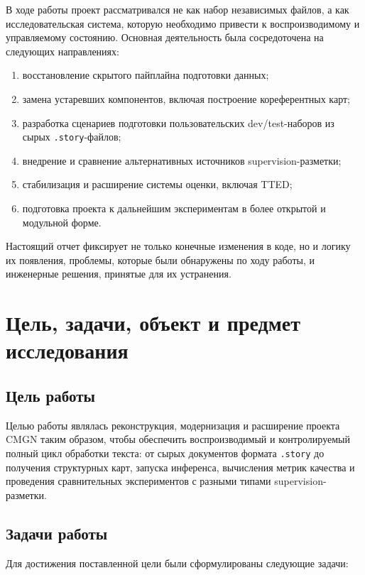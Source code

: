 \documentclass[12pt,a4paper]{article}
\begin{document}
В ходе работы проект рассматривался не как набор независимых файлов, а как
исследовательская система, которую необходимо привести к воспроизводимому и управляемому
состоянию. Основная деятельность была сосредоточена на следующих направлениях:

\begin{enumerate}
    \item восстановление скрытого пайплайна подготовки данных;
    \item замена устаревших компонентов, включая построение кореферентных карт;
    \item разработка сценариев подготовки пользовательских dev/test-наборов из сырых
    \texttt{.story}-файлов;
    \item внедрение и сравнение альтернативных источников supervision-разметки;
    \item стабилизация и расширение системы оценки, включая TTED;
    \item подготовка проекта к дальнейшим экспериментам в более открытой и модульной форме.
\end{enumerate}

Настоящий отчет фиксирует не только конечные изменения в коде, но и логику их появления,
проблемы, которые были обнаружены по ходу работы, и инженерные решения, принятые для их
устранения.

\section{Цель, задачи, объект и предмет исследования}

\subsection{Цель работы}

Целью работы являлась реконструкция, модернизация и расширение проекта CMGN таким
образом, чтобы обеспечить воспроизводимый и контролируемый полный цикл обработки текста:
от сырых документов формата \texttt{.story} до получения структурных карт, запуска
инференса, вычисления метрик качества и проведения сравнительных экспериментов с разными
типами supervision-разметки.

\subsection{Задачи работы}

Для достижения поставленной цели были сформулированы следующие задачи:
\end{document}
